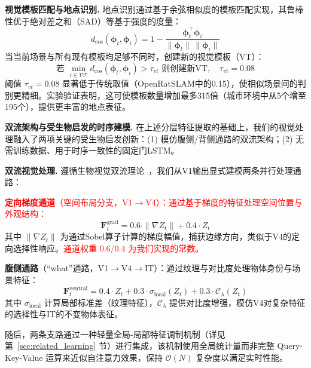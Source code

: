 \textbf{视觉模板匹配与地点识别.} 地点识别通过基于余弦相似度的模板匹配实现，其鲁棒性优于绝对差之和（SAD）等基于强度的度量：
\begin{equation}
    d_{\cos}(\boldsymbol{\phi}_t,\boldsymbol{\phi}_i)=1-\frac{\boldsymbol{\phi}_t^\top\boldsymbol{\phi}_i}{\lVert\boldsymbol{\phi}_t\rVert\,\lVert\boldsymbol{\phi}_i\rVert}
\end{equation}
当当前场景与所有现有模板均足够不同时，创建新的视觉模板（VT）：
\begin{equation}
    \text{若 }\min_{i \in \mathcal{VT}} d_{\cos}(\boldsymbol{\phi}_t, \boldsymbol{\phi}_i)>\tau_{vt}\text{ 则创建新VT},\quad \tau_{vt}=0.08
\end{equation}
阈值 $\tau_{vt}=0.08$ 显著低于传统取值（OpenRatSLAM中的0.15），使相似场景间的判别更精细。实验验证表明，这可使模板数量增加最多315倍（城市环境中从5个增至195个），提供更丰富的地点表征。

\textbf{双流架构与受生物启发的时序建模.} 在上述分层特征提取的基础上，我们的视觉处理融入了两项关键的受生物启发创新：(1) 模仿腹侧/背侧通路的双流架构；(2) 无需训练数据、用于时序一致性的固定门LSTM。

\textbf{双流视觉处理.}
遵循生物视觉双流理论~\cite{Goodale1992, Mishkin1983}，我们从V1输出显式建模两条并行处理通路：

\textcolor{red}{\textbf{定向梯度通道}（空间布局分支，V1$\rightarrow$V4）：通过基于梯度的特征处理空间位置与外观结构：}
\begin{equation}
    \mathbf{F}^{\text{grad}}_t = 0.6 \cdot \|\nabla Z_t\| + 0.4 \cdot Z_t
\end{equation}
其中 $\|\nabla Z_t\|$ 为通过Sobel算子计算的梯度幅值，捕获边缘方向，类似于V4的定向选择性响应。\textcolor{red}{通道权重 $0.6/0.4$ 为我们实现的常数。}

\textbf{腹侧通路}（“what”通路，V1$\rightarrow$V4$\rightarrow$IT）：通过纹理与对比度处理物体身份与场景特征：
\begin{equation}
    \mathbf{F}^{\text{ventral}}_t = 0.4 \cdot Z_t + 0.3 \cdot \sigma_{\text{local}}(Z_t) + 0.3 \cdot \mathcal{C}_\lambda(Z_t)
\end{equation}
其中 $\sigma_{\text{local}}$ 计算局部标准差（纹理特征），$\mathcal{C}_\lambda$ 提供对比度增强，模仿V4对复杂特征的选择性与IT的不变物体表征。

随后，两条支路通过一种轻量全局-局部特征调制机制（详见第~\ref{sec:related_learning} 节）进行集成，该机制使用全局统计量而非完整 Query-Key-Value 运算来近似自注意力效果，保持 $\mathcal{O}(N)$ 复杂度以满足实时性能。

